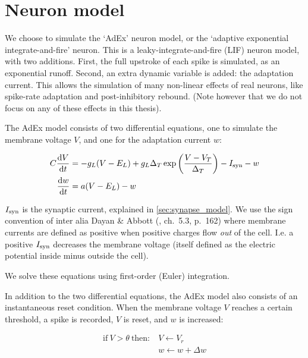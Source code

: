 
\section{Neuron model}

We choose to simulate the `AdEx' neuron model, or the `adaptive exponential integrate-and-fire' neuron.\cite{Gerstner2009AdaptiveExponentialIntegrateandfire}
This is a leaky-integrate-and-fire (LIF) neuron model, with two additions.
First, the full upstroke of each spike is simulated, as an exponential runoff.
Second, an extra dynamic variable is added: the adaptation current.
This allows the simulation of many non-linear effects of real neurons, like spike-rate adaptation and post-inhibitory rebound. (Note however that we do not focus on any of these effects in this thesis).

The AdEx model consists of two differential equations, one to simulate the membrane voltage $V$, and one for the adaptation current $w$:

\begin{align}
    C \frac{\mathrm{d}V}{\mathrm{d}t} &=  -g_L (V - E_L)
                            + g_L \Delta_T \exp \left(\frac{V-V_T}{\Delta_T}  \right)
                            - I_{\text{syn}} - w
                            \label{eq:AdEx-V}
                            \\
    \frac{\mathrm{d}w}{\mathrm{d}t} &= a (V - E_L) - w
        \label{eq:AdEx-w}
\end{align}

$I_{\text{syn}}$ is the synaptic current, explained in \cref{sec:synapse_model}.
We use the sign convention of inter alia Dayan \& Abbott (\cite{Dayan2001TheoreticalNeuroscienceComputational}, ch.~5.3, p.~162) where membrane currents are defined as positive when positive charges flow \emph{out} of the cell. I.e. a positive $I_{\text{syn}}$ decreases the membrane voltage (itself defined as the electric potential inside minus outside the cell).

We solve these equations using first-order (Euler) integration.

In addition to the two differential equations, the AdEx model also consists of an instantaneous reset condition. When the membrane voltage $V$ reaches a certain threshold, a spike is recorded, $V$ is reset, and $w$ is increased:

\begin{align}
    \text{if}\ V > \theta\ \text{then:}\
    & V \leftarrow V_r \\
    & w \leftarrow w + \Delta w
    \label{eq:AdEx-reset}
\end{align}

